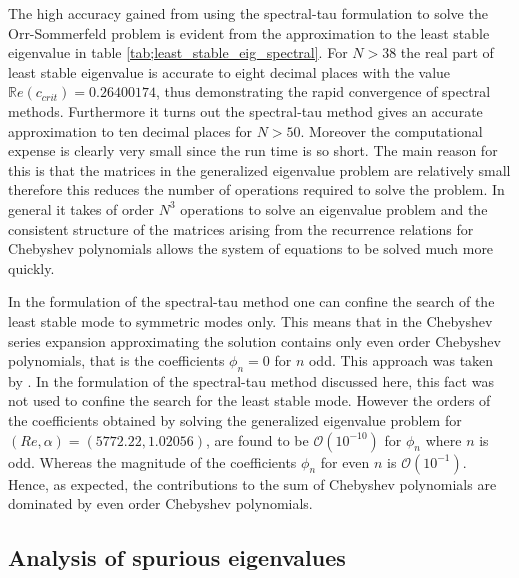 \documentclass[a4paper, 12pt, twoside, openright]{article}
\numberwithin{equation}{section}
\begin{document}
The high accuracy gained from using the spectral-tau formulation to solve the Orr-Sommerfeld problem is evident from the approximation to the least stable eigenvalue in table \ref{tab;least_stable_eig_spectral}. For $N>38$ the real part of least stable eigenvalue is accurate to eight decimal places with the value $\mathbb{R}e(c_{crit})=0.26400174$, thus demonstrating the rapid convergence of spectral methods. Furthermore it turns out the spectral-tau method gives an accurate approximation to ten decimal places for $N>50$. Moreover the computational expense is clearly very small since the run time is so short. The main reason for this is that the matrices in the generalized eigenvalue problem are relatively small therefore this reduces the number of operations required to solve the problem. In general it takes of order $N^3$ operations to solve an eigenvalue problem and the consistent structure of the matrices arising from the recurrence relations for Chebyshev polynomials allows the system of equations to be solved much more quickly. %

In the formulation of the spectral-tau method one can confine the search of the least stable mode to symmetric modes only. This means that in the Chebyshev series expansion approximating the solution contains only even order Chebyshev polynomials, that is the coefficients $\phi_n = 0$ for $n$ odd. This approach was taken by \cite{Orszag71}. In the formulation of the spectral-tau method discussed here, this fact was not used to confine the search for the least stable mode. However the orders of the coefficients obtained by solving the generalized eigenvalue problem for $(Re,\alpha) = (5772.22,1.02056)$, are found to be $\mathcal{O}(10^{-10})$ for $\phi_n$ where $n$ is odd. Whereas the magnitude of the coefficients $\phi_n$ for even $n$ is $\mathcal{O}(10^{-1})$. Hence, as expected, the contributions to the sum of Chebyshev polynomials are dominated by even order Chebyshev polynomials. 

\subsection{Analysis of spurious eigenvalues}
\end{document}
